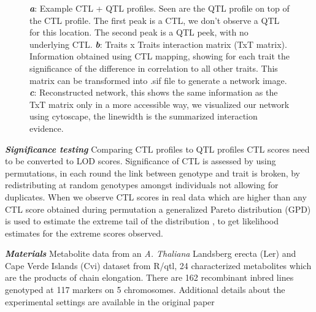 \documentclass{bioinfo}
\begin{document}
\begin{figure}[ht]
\begin{center}
{      \label{subfigc}
    }
  \end{center}
  \begin{minipage}{7in}
  \label{newplots}
  \vspace{-0.7cm}
  \caption[Plots]{
  {\emph {\bf a}}: Example CTL + QTL profiles. Seen are the QTL profile on top of the CTL profile. 
  The first peak is a CTL, we don't observe a QTL for this location. The second peak is a QTL peek, with no underlying CTL. 
  {\emph {\bf b}}: Traits x Traits interaction matrix (TxT matrix). Information obtained using CTL mapping, 
  showing for each trait the significance of the difference in correlation to all other traits. This 
  matrix can be transformed into .sif file to generate a network image. 
  {\emph {\bf c}}:  Reconstructed network, this shows the same information as the TxT matrix only in a more accessible way, we visualized our 
  network using cytoscape, the linewidth is the summarized interaction evidence.
 }
\end{minipage}
\vspace{-0.5cm}
\end{figure}

\emph{ {\bf Significance testing}}
  Comparing CTL profiles to QTL profiles CTL scores need to be converted to LOD scores. Significance 
  of CTL is assessed by using permutations, in each round the link between genotype and 
  trait is broken, by redistributing at random genotypes amongst individuals not 
  allowing for duplicates. When we observe CTL scores in real data which are higher than any 
  CTL score obtained during permutation a generalized Pareto distribution (GPD) is used to 
  estimate the extreme tail of the distribution \cite{Knijnenburg:2009}, to get likelihood estimates for the 
  extreme scores observed.

\emph{ {\bf Materials}}
  Metabolite data from an \emph{A. Thaliana} Landsberg erecta (Ler) and Cape Verde Islands (Cvi) 
  dataset from R/qtl, 24 characterized metabolites which are the products of chain elongation. 
  There are 162 recombinant inbred lines genotyped at 117 markers on 5 chromosomes. Additional 
  details about the experimental settings are available in the original paper \cite{Keurentjes:2006,AlonsoBlanco:1998}
\vspace{-0.6cm}
\end{document}
